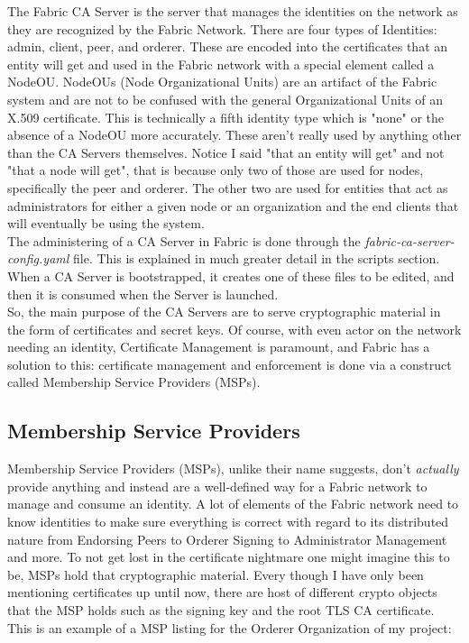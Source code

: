 		\hspace{10mm}The Fabric CA Server is the server that manages the identities on the network as they are recognized by the Fabric Network. There are four types of Identities: admin, client, peer, and orderer. These are encoded into the certificates that an entity will get and used in the Fabric network with a special element called a NodeOU. NodeOUs (Node Organizational Units) are an artifact of the Fabric system and are not to be confused with the general Organizational Units of an X.509 certificate. This is technically a fifth identity type which is "none" or the absence of a NodeOU more accurately. These aren't really used by anything other than the CA Servers themselves. Notice I said "that an entity will get" and not "that a node will get", that is because only two of those are used for nodes, specifically the peer and orderer. The other two are used for entities that act as administrators for either a given node or an organization and the end clients that will eventually be using the system. \\
		
		\hspace{10mm}The administering of a CA Server in Fabric is done through the \textit{fabric-ca-server-config.yaml} file. This is explained in much greater detail in the scripts section. When a CA Server is bootstrapped, it creates one of these files to be edited, and then it is consumed when the Server is launched. \\
		
		\hspace{10mm}So, the main purpose of the CA Servers are to serve cryptographic material in the form of certificates and secret keys. Of course, with even actor on the network needing an identity, Certificate Management is paramount, and Fabric has a solution to this: certificate management and enforcement is done via a construct called Membership Service Providers (MSPs).\\
		
	\subsection{Membership Service Providers}
		\hspace{10mm}Membership Service Providers (MSPs), unlike their name suggests, don't \textit{actually} provide anything and instead are a well-defined way for a Fabric network to manage and consume an identity. A lot of elements of the Fabric network need to know identities to make sure everything is correct with regard to its distributed nature from Endorsing Peers to Orderer Signing to Administrator Management and more. To not get lost in the certificate nightmare one might imagine this to be, MSPs hold that cryptographic material. Every though I have only been mentioning certificates up until now, there are host of different crypto objects that the MSP holds such as the signing key and the root TLS CA certificate. This is an example of a MSP listing for the Orderer Organization of my project:
		
